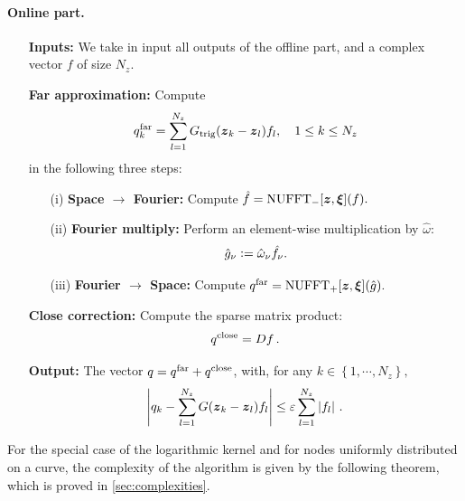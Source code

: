 \documentclass[smallextended]{svjour3}
\begin{document}
\paragraph{Online part.}
\begin{itemize}
	\item[] \textbf{Inputs:} We take in input all outputs of the offline part, and a complex vector $f$ of size $N_z$. 
	\item[] \textbf{Far approximation:} Compute
	      \begin{equation}
	      	\label{FarApprox}
	      	q^{\text{far}}_k = \sum_{l=1}^{N_z} G_{\textup{trig}}(\boldsymbol{z}_k - \boldsymbol{z}_l) f_l, \quad 1 \leq k \leq N_z
	      \end{equation} 
	      in the following three steps:
	      	\begin{itemize}
	      		\setlength{\itemindent}{2em}
	      		\item[(i)] \textbf{Space $\rightarrow$ Fourier: } Compute $\hat{f} = \textup{NUFFT}_-[\boldsymbol{z},\boldsymbol{\xi}](f).$
	      		\item[(ii)] \textbf{Fourier multiply:} Perform an element-wise multiplication by $\hat{\omega}$:
	      		\[{\hat{g}_{\nu} \mathrel{\mathop:}= \hat{\omega}_\nu \hat{f_\nu}.}\]
	      		\item[(iii)] \textbf{Fourier $\rightarrow$ Space: } Compute $q^{\text{far}} =  \textup{NUFFT}_+[\boldsymbol{z},\boldsymbol{\xi}](\hat{g}).$
	      		\setlength{\itemindent}{0em}
	      	\end{itemize}
	      
			\item[] \textbf{Close correction:} Compute the sparse matrix product:
		      \[q^{\textup{close}} = Df \,.\]
			\item[] \textbf{Output:} The vector $q = q^{\textup{far}} + q^{\textup{close}}$, with, for any $k \in \left\{1,\cdots,N_z\right\},$	
		      \[ \left\lvert q_k - \sum_{l = 1}^{N_z} G({\boldsymbol{z}_k - \boldsymbol{z}_l}) f_l \right\rvert \leq \varepsilon \sum_{l=1}^{N_z} \left\lvert f_l \right\rvert\,.\]
\end{itemize}
For the special case of the logarithmic kernel and for nodes uniformly distributed on a curve, the complexity of the algorithm is given by the following theorem, which is proved in \autoref{sec:complexities}.
\end{document}

